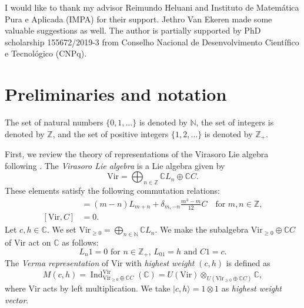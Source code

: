 \documentclass[a4paper, 12pt, reqno]{amsart}
\theoremstyle{remark}
\DeclareMathOperator{\Ind}{Ind}
\newcommand{\Vir}{{\mathrm{Vir}}}
\begin{document}
I would like to thank my advisor Reimundo Heluani and Instituto de Matemática Pura e Aplicada (IMPA) for their support.
Jethro Van Ekeren made some valuable suggestions as well.
The author is partially supported by PhD scholarship 155672/2019-3 from Conselho Nacional de Desenvolvimento Científico e Tecnológico (CNPq).

\section{Preliminaries and notation}
\label{sec:prel-notat}

The set of natural numbers $\{0, 1, \dots\}$ is denoted by $\mathbb{N}$, the set of integers is denoted by $\mathbb{Z}$, and the set of positive integers $\{1, 2, \dots\}$ is denoted by $\mathbb{Z}_+$.

First, we review the theory of representations of the Virasoro Lie algebra following \cite{kac_bombay_2013}.
The \emph{Virasoro Lie algebra} is a Lie algebra given by
\begin{equation*}
  \Vir = \bigoplus_{n \in \mathbb{Z}}\mathbb{C}L_n \oplus \mathbb{C}C.
\end{equation*}
These elements satisfy the following commutation relations:
\begin{align*}
  [L_m, L_n] &= (m - n)L_{m + n} + \delta_{m, -n}\frac{m^3 - m}{12}C \quad \text{for $m, n \in \mathbb{Z}$}, \\
  [\Vir, C] &= 0.
\end{align*}
Let $c, h \in \mathbb{C}$.
We set $\Vir_{\ge 0} = \bigoplus_{n \in \mathbb{N}}\mathbb{C}L_n$.
We make the subalgebra $\Vir_{\ge 0} \oplus \mathbb{C}C$ of $\Vir$ act on $\mathbb{C}$ as follows:
\begin{equation*}
  \text{$L_n1 = 0$ for $n \in \mathbb{Z}_+$, $L_01 = h$ and $C1 = c$}.
\end{equation*}
The \emph{Verma representation} of $\Vir$ with \emph{highest weight} $(c, h)$ is defined as
\begin{equation*}
  M(c, h) = \Ind^{\Vir}_{\Vir_{\ge 0} \oplus \mathbb{C}C}(\mathbb{C}) = U(\Vir) \otimes_{U(\Vir_{\ge 0} \oplus \mathbb{C}C)} \mathbb{C},
\end{equation*}
where $\Vir$ acts by left multiplication.
We take $|c, h\rangle = 1\otimes1$ as \emph{highest weight vector}.
\end{document}
